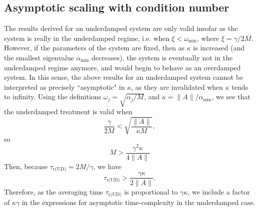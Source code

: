 \documentclass[prx,onecolumn,floatfix,longbibliography,notitlepage, nofootinbib,12pt]{revtex4-2}
\begin{document}
\begin{appendix}
\subsection{Asymptotic scaling with condition  number}
The results derived for an underdamped system are only valid insofar as the system is really in the underdamped regime, i.e. when $\xi < \omega_\text{min}$, where $\xi = \gamma/ 2M$. However, if the parameters of the system are fixed,  then as $\kappa$ is increased (and the smallest eigenvalue $\alpha_\text{min}$ decreases), the system is eventually not in the underdamped regime anymore, and would begin to behave as an overdamped system. In this sense, the above results for an underdamped system cannot be interpreted as precisely ``asymptotic" in $\kappa$, as they are invalidated when $\kappa$ tends to infinity. Using the definitions $\omega_j = \sqrt{\alpha_j/M}$, and $\kappa = \|A\|/\alpha_\text{min}$, we see that the underdamped treatment is valid when
\begin{equation}
    \frac{\gamma}{2M}< \sqrt{\frac{\|A\|}{\kappa M}},
\end{equation}
so
\begin{equation}
    M > \frac{\gamma^2 \kappa}{4\|A\|}
\end{equation}
Then, because $\tau_\text{r(UD)} = 2 M / \gamma$, we have
\begin{equation}
    \tau_\text{r(UD)}>   \frac{\gamma \kappa}{2\|A\|}.
\end{equation}
Therefore, as the averaging time $\tau_\text{r(UD)}$ is proportional to $\gamma \kappa$, we include a factor of $\kappa \gamma$ in the expressions for asymptotic time-complexity in the underdamped case.

\end{appendix}
\end{document}
